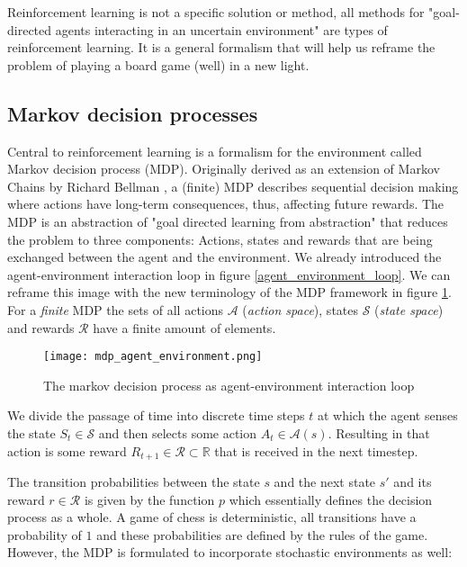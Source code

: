 Reinforcement learning is not a specific solution or method, all methods for "goal-directed agents interacting in an uncertain environment" \cite[p. 3]{sutton_reinforcement_2018} are types of reinforcement learning. It is a general formalism that will help us reframe the problem of playing a board game (well) in a new light.

\subsection{Markov decision processes}
Central to reinforcement learning is a formalism for the environment called Markov decision process (MDP). Originally derived as an extension of Markov Chains by Richard Bellman \cite{yang_markov_2019, bellman_markovian_1957}, a (finite) MDP describes sequential decision making where actions have long-term consequences, thus, affecting future rewards. The MDP is an abstraction of "goal directed learning from abstraction" that reduces the problem to three components: Actions, states and rewards that are being exchanged between the agent and the environment. We already introduced the agent-environment interaction loop in figure \ref{agent_environment_loop}. We can reframe this image with the new terminology of the MDP framework in figure \ref{mdp_agent_environment}. For a \textit{finite} MDP the sets of all actions $ \mathcal{A}$ (\textit{action space}), states $\mathcal{S}$ (\textit{state space}) and rewards $ \mathcal{R} $ have a finite amount of elements.

\begin{figure}
    \centering
    \texttt{[image: mdp\_agent\_environment.png]}
    \caption{The markov decision process as agent-environment interaction loop}
    \label{mdp_agent_environment}
\end{figure}

We divide the passage of time into discrete time steps $ t $ at which the agent senses the state $ S_t \in \mathcal{S} $ and then selects some action $ A_t \in \mathcal{A}(s) $. Resulting in that action is some reward $ R_{t+1} \in \mathcal{R} \subset \mathbb{R} $ that is received in the next timestep.

The transition probabilities between the state $ s $ and the next state $ s' $ and its reward $r \in \mathcal{R}$ is given by the function $ p $ which essentially defines the decision process as a whole. A game of chess is deterministic, all transitions have a probability of $1$ and these probabilities are defined by the rules of the game. However, the MDP is formulated to incorporate stochastic environments as well:

